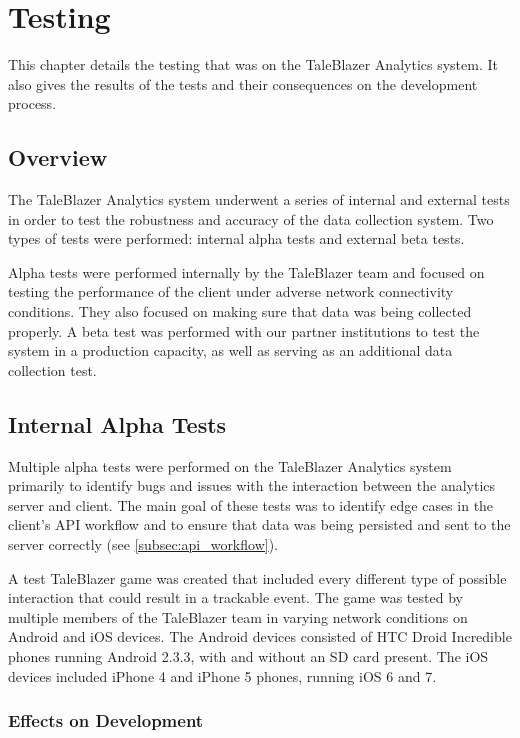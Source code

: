 \chapter{Testing}

This chapter details the testing that was on the TaleBlazer Analytics system. It also gives the results of the tests and their consequences on the development process. 

\section{Overview}

The TaleBlazer Analytics system underwent a series of internal and external tests in order to test the robustness and accuracy of the data collection system. Two types of tests were performed: internal alpha tests and external beta tests. 

Alpha tests were performed internally by the TaleBlazer team and focused on testing the performance of the client under adverse network connectivity conditions. They also focused on making sure that data was being collected properly. A beta test was performed with our partner institutions to test the system in a production capacity, as well as serving as an additional data collection test. 

\section{Internal Alpha Tests}

Multiple alpha tests were performed on the TaleBlazer Analytics system primarily to identify bugs and issues with the interaction between the analytics server and client. The main goal of these tests was to identify edge cases in the client's API workflow and to ensure that data was being persisted and sent to the server correctly (see \ref{subsec:api_workflow}). 

A test TaleBlazer game was created that included every different type of possible interaction that could result in a trackable event. The game was tested by multiple members of the TaleBlazer team in varying network conditions on Android and iOS devices. The Android devices consisted of HTC Droid Incredible phones running Android 2.3.3, with and without an SD card present. The iOS devices included iPhone 4 and iPhone 5 phones, running iOS 6 and 7. 

\subsection{Effects on Development}


